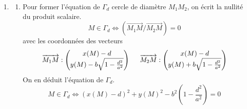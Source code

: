 \begin{enumerate}
 \item
\begin{enumerate}
 \item Pour former l'équation de $\Gamma_d$ cercle de diamètre $M_1 M_2$, on écrit la nullité du produit scalaire.
\begin{displaymath}
 M\in \Gamma_d \Leftrightarrow (\overrightarrow{M_1M}/ \overrightarrow{M_2M}) = 0
\end{displaymath}
avec les coordonnées des vecteurs
\begin{displaymath}
 \overrightarrow{M_1M}:
\begin{pmatrix}
 x(M)-d \\ y(M)-b\sqrt{1-\frac{d^2}{a^2}}
\end{pmatrix}
\hspace{0.5cm}
 \overrightarrow{M_2M}:
\begin{pmatrix}
 x(M)-d \\ y(M)+b\sqrt{1-\frac{d^2}{a^2}}
\end{pmatrix}
\end{displaymath}
On en déduit l'équation de $\Gamma_d$.
\begin{displaymath}
 M\in \Gamma_d \Leftrightarrow
(x(M)-d)^2+ y(M)^2-b^2(1-\frac{d^2}{a^2})=0
\end{displaymath}


\end{enumerate}
\end{enumerate}
